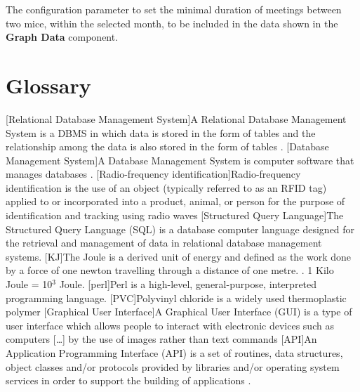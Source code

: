 \documentclass[a4paper,10pt,twoside,titlepage,headings=small,bibliography=totocnumbered,headsepline]{scrartcl}
\begin{document}
\begin{appendix}
The configuration parameter to set the minimal duration of meetings between two mice, within the selected month, to be included in the data shown in the \textbf{Graph Data} component. 



\newpage

\section{Glossary}
\begin{acronym}
[Relational Database Management System]{A Relational Database Management System is a \acs{DBMS} in which data is stored in the form of tables and the relationship among the data is also stored in the form of tables \cite{wiki:rdbms}.}
[Database Management System]{A Database Management System is computer software that manages databases \cite{wiki:dbms}.}
[Radio-frequency identification]{Radio-frequency identification is the use of an object (typically referred to as an RFID tag) applied to or incorporated into a product, animal, or person for the purpose of identification and tracking using radio waves \cite{wiki:rfid}}
[Structured Query Language]{The Structured Query Language (SQL) is a database computer language designed for the retrieval and management of data in relational database management systems.\cite{wiki:sql}}
[KJ]{The Joule is a derived unit of energy and defined as the work done by a force of one newton travelling through a distance of one metre. \cite{wiki:joule}. 1 Kilo Joule = 10$^3$ Joule.}
[perl]{Perl is a high-level, general-purpose, interpreted programming language. \cite{wiki:perl}}
[PVC]{Polyvinyl chloride is a widely used thermoplastic polymer \cite{wiki:pvc}}
[Graphical User Interface]{A Graphical User Interface (GUI) is a type of user interface which allows people to interact with electronic devices such as computers [\ldots] by the use of images rather than text commands \cite{wiki:gui}}
[API]{An Application Programming Interface (API) is a set of routines, data structures, object classes and/or protocols provided by libraries and/or operating system services in order to support the building of applications \cite{wiki:api}.}

\end{acronym}
\end{appendix}
\end{document}

